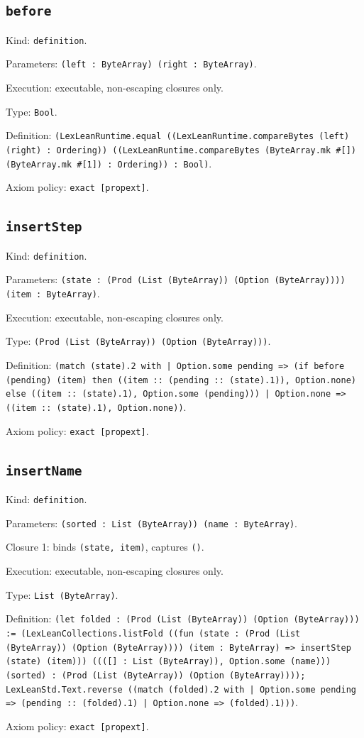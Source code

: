 \documentclass[11pt]{article}
\begin{document}
\subsection*{\texttt{before}}
\noindent Kind: \texttt{definition}.\par
\noindent Parameters: \texttt{(left : ByteArray) (right : ByteArray)}.\par
\noindent Execution: executable, non-escaping closures only.\par
\noindent Type: \texttt{Bool}.\par
\noindent Definition: \texttt{(LexLeanRuntime.equal ((LexLeanRuntime.compareBytes (left) (right) : Ordering)) ((LexLeanRuntime.compareBytes (ByteArray.mk \#[]) (ByteArray.mk \#[1]) : Ordering)) : Bool)}.\par
\noindent Axiom policy: \texttt{exact [propext]}.\par
\subsection*{\texttt{insertStep}}
\noindent Kind: \texttt{definition}.\par
\noindent Parameters: \texttt{(state : (Prod (List (ByteArray)) (Option (ByteArray)))) (item : ByteArray)}.\par
\noindent Execution: executable, non-escaping closures only.\par
\noindent Type: \texttt{(Prod (List (ByteArray)) (Option (ByteArray)))}.\par
\noindent Definition: \texttt{(match (state).2 with | Option.some pending => (if before (pending) (item) then ((item :: (pending :: (state).1)), Option.none) else ((item :: (state).1), Option.some (pending))) | Option.none => ((item :: (state).1), Option.none))}.\par
\noindent Axiom policy: \texttt{exact [propext]}.\par
\subsection*{\texttt{insertName}}
\noindent Kind: \texttt{definition}.\par
\noindent Parameters: \texttt{(sorted : List (ByteArray)) (name : ByteArray)}.\par
\noindent Closure 1: binds \texttt{(state, item)}, captures \texttt{()}.\par
\noindent Execution: executable, non-escaping closures only.\par
\noindent Type: \texttt{List (ByteArray)}.\par
\noindent Definition: \texttt{(let folded : (Prod (List (ByteArray)) (Option (ByteArray))) := (LexLeanCollections.listFold ((fun (state : (Prod (List (ByteArray)) (Option (ByteArray)))) (item : ByteArray) => insertStep (state) (item))) ((([] : List (ByteArray)), Option.some (name))) (sorted) : (Prod (List (ByteArray)) (Option (ByteArray)))); LexLeanStd.Text.reverse ((match (folded).2 with | Option.some pending => (pending :: (folded).1) | Option.none => (folded).1)))}.\par
\noindent Axiom policy: \texttt{exact [propext]}.\par
\end{document}
